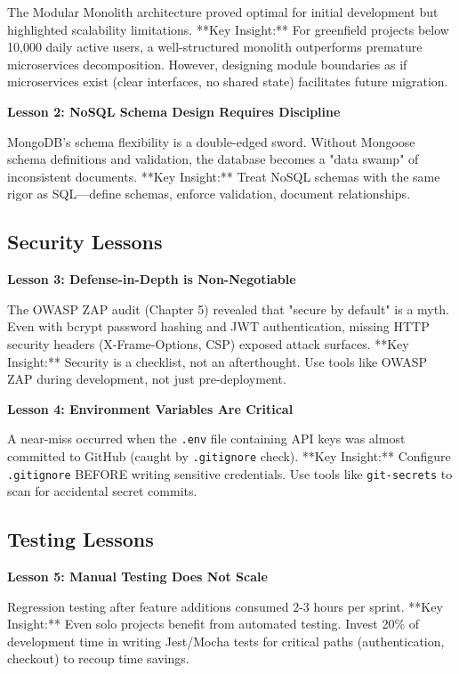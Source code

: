 The Modular Monolith architecture proved optimal for initial development but highlighted scalability limitations. **Key Insight:** For greenfield projects below 10,000 daily active users, a well-structured monolith outperforms premature microservices decomposition. However, designing module boundaries as if microservices exist (clear interfaces, no shared state) facilitates future migration.

\textbf{Lesson 2: NoSQL Schema Design Requires Discipline}

MongoDB's schema flexibility is a double-edged sword. Without Mongoose schema definitions and validation, the database becomes a "data swamp" of inconsistent documents. **Key Insight:** Treat NoSQL schemas with the same rigor as SQL—define schemas, enforce validation, document relationships.

\subsection{Security Lessons}

\textbf{Lesson 3: Defense-in-Depth is Non-Negotiable}

The OWASP ZAP audit (Chapter 5) revealed that "secure by default" is a myth. Even with bcrypt password hashing and JWT authentication, missing HTTP security headers (X-Frame-Options, CSP) exposed attack surfaces. **Key Insight:** Security is a checklist, not an afterthought. Use tools like OWASP ZAP during development, not just pre-deployment.

\textbf{Lesson 4: Environment Variables Are Critical}

A near-miss occurred when the \texttt{.env} file containing API keys was almost committed to GitHub (caught by \texttt{.gitignore} check). **Key Insight:** Configure \texttt{.gitignore} BEFORE writing sensitive credentials. Use tools like \texttt{git-secrets} to scan for accidental secret commits.

\subsection{Testing Lessons}

\textbf{Lesson 5: Manual Testing Does Not Scale}

Regression testing after feature additions consumed 2-3 hours per sprint. **Key Insight:** Even solo projects benefit from automated testing. Invest 20\% of development time in writing Jest/Mocha tests for critical paths (authentication, checkout) to recoup time savings.

